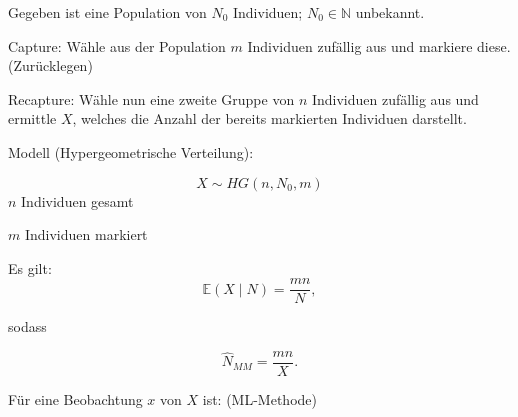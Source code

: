 \documentclass[10pt]{article}
\newcommand{\EW}{\mathbb{E}} %
\newenvironment{BSP}[1][]
{\begin{Beispiel}[frametitle=#1]}{\end{Beispiel}}
\begin{document}
	\begin{BSP}[Beispiel 1.3.9 (Schätzung der Populationsgröße mit der Capture/Recapture-Methode)]
		Gegeben ist eine Population von $N_0$ Individuen; $N_0 \in \mathbb{N}$ unbekannt. 
		
		Capture: Wähle aus der Population $m$ Individuen zufällig aus und markiere diese. (Zurücklegen)
		
		Recapture: Wähle nun eine zweite Gruppe von $n$ Individuen zufällig aus und ermittle $X$, welches die Anzahl der bereits markierten Individuen darstellt. 
		
		Modell (Hypergeometrische Verteilung):
		
		\begin{equation*}
			X \sim HG(n,N_0,m)
		\end{equation*}
		$n$ Individuen gesamt
		
		$m$ Individuen markiert
		
		Es gilt:
		\begin{equation*}
			\EW(X \mid N) = \frac{mn}{N},
		\end{equation*}
		
		sodass
		
		\begin{equation*}
			\hat{N}_{MM}=\frac{mn}{X}.
		\end{equation*}
		
		Für eine Beobachtung $x$ von $X$ ist: (ML-Methode)
		

\end{BSP}
\end{document}
